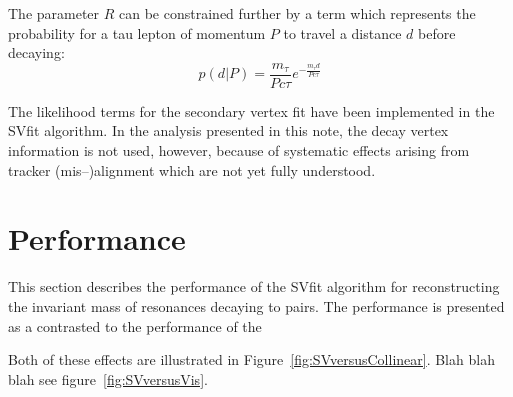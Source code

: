 The parameter $R$ can be constrained further by a term which represents the
probability for a tau lepton of momentum $P$ to travel a distance $d$ before
decaying:
\begin{equation*}
p \left( d | P \right) = \frac{m_\tau}{P c\tau}e^{-\frac{m_\tau d}{P c\tau}}
\end{equation*}

The likelihood terms for the secondary vertex fit have been implemented in the
SVfit algorithm.  In the analysis presented in this note, the decay vertex
information is not used, however, because of systematic effects arising from
tracker (mis--)alignment which are not yet fully understood.

\section{Performance}

This section describes the performance of the SVfit algorithm for reconstructing
the invariant mass of resonances decaying to \taul pairs.  The performance is
presented as a contrasted to the performance of the  

Both of these effects are illustrated in
Figure~\ref{fig:SVversusCollinear}.
Blah blah blah see figure~\ref{fig:SVversusVis}.

